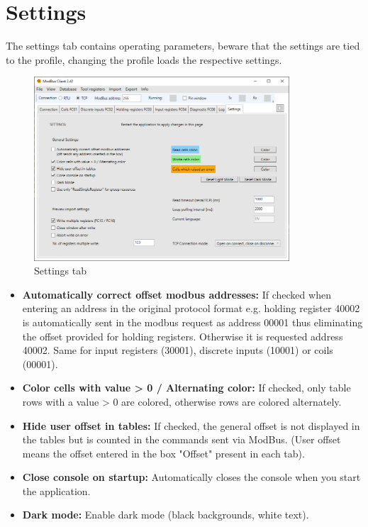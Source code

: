 
\chapter{Settings}

The settings tab contains operating parameters,
beware that the settings are tied to the profile,
changing the profile loads the respective settings.

\begin{figure}[H]
    \centering
    \includegraphics[width=0.85\textwidth]{../Img/Modbus_Client_Settings_00.PNG}
    \caption{Settings tab}
\end{figure}

\begin{itemize}
    \item \textbf{Automatically correct offset modbus addresses:}
    If checked when entering an address in the original protocol format e.g.
    holding register 40002 is automatically sent in the modbus request as address
    00001 thus eliminating the offset provided for holding registers. Otherwise it is 
    requested
    address 40002. Same for input registers (30001), discrete inputs (10001)
    or coils (00001).
    \item \textbf{Color cells with value > 0 / Alternating color:}
    If checked, only table rows with a value > 0 are colored, otherwise rows
    are colored alternately.
    \item \textbf{Hide user offset in tables:}
    If checked, the general offset is not displayed in the tables but is counted in the commands
    sent via ModBus. (User offset means the offset entered in the box "Offset" present
    in each tab).
    \item \textbf{Close console on startup:}
    Automatically closes the console when you start the application.
    \item \textbf{Dark mode:}
    Enable dark mode (black backgrounds, white text).
\end{itemize}

